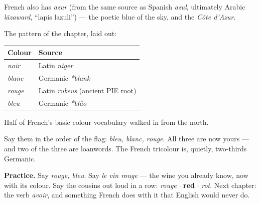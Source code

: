\begin{culture}
French also has \emph{azur} (from the same source as Spanish \emph{azul},
ultimately Arabic \emph{l\=azaward}, ``lapis lazuli'') --- the poetic blue of
the sky, and the \emph{C\^{o}te d'Azur}.
\end{culture}

The pattern of the chapter, laid out:

\begin{center}
\begin{tabular}{@{}ll@{}}
\toprule
Colour & Source \\
\midrule
\emph{noir} & Latin \emph{niger} \\
\emph{blanc} & Germanic \emph{*blank} \\
\emph{rouge} & Latin \emph{rubeus} (ancient PIE root) \\
\emph{bleu} & Germanic \emph{*bl\=ao} \\
\bottomrule
\end{tabular}
\end{center}

Half of French's basic colour vocabulary walked in from the north.

\begin{culture}
Say them in the order of the flag: \emph{bleu, blanc, rouge}. All three are now
yours --- and two of the three are loanwords. The French tricolour is, quietly,
two-thirds Germanic.
\end{culture}

\begin{grammarlens}
\textbf{Practice.} Say \emph{rouge, bleu}. Say \emph{le vin rouge} --- the wine
you already know, now with its colour. Say the cousins out loud in a row:
\emph{rouge} $\cdot$ \textbf{red} $\cdot$ \emph{rot}. Next chapter: the verb
\emph{avoir}, and something French does with it that English would never do.
\end{grammarlens}
